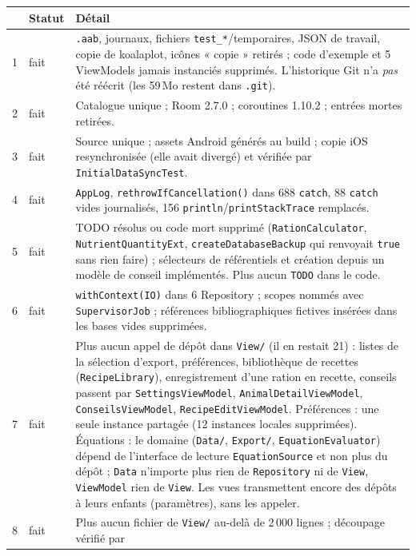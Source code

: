 \documentclass[11pt,a4paper]{article}
\newcommand{\code}[1]{\texttt{#1}}
\begin{document}
\begin{longtable}{p{0.5cm}p{3.2cm}p{11cm}}
\toprule
 & Statut & Détail \\
\midrule
1 & fait & \code{.aab}, journaux, fichiers \code{test\_*}/temporaires, JSON de travail, copie de
           koalaplot, icônes « copie » retirés ; code d'exemple et 5 ViewModels jamais instanciés
           supprimés. L'historique Git n'a \emph{pas} été réécrit (les 59\,Mo restent dans
           \code{.git}). \\
2 & fait & Catalogue unique ; Room 2.7.0 ; coroutines 1.10.2 ; entrées mortes retirées. \\
3 & fait & Source unique ; assets Android générés au build ; copie iOS resynchronisée (elle
           avait divergé) et vérifiée par \code{InitialDataSyncTest}. \\
4 & fait & \code{AppLog}, \code{rethrowIfCancellation()} dans 688 \code{catch}, 88 \code{catch}
           vides journalisés, 156 \code{println}/\code{printStackTrace} remplacés. \\
5 & fait & TODO résolus ou code mort supprimé (\code{RationCalculator},
           \code{NutrientQuantityExt}, \code{createDatabaseBackup} qui renvoyait \code{true}
           sans rien faire) ; sélecteurs de référentiels et création depuis un modèle de conseil
           implémentés. Plus aucun \code{TODO} dans le code. \\
6 & fait & \code{withContext(IO)} dans 6 Repository ; scopes nommés avec \code{SupervisorJob} ;
           références bibliographiques fictives insérées dans les bases vides supprimées. \\
7 & fait & Plus aucun appel de dépôt dans \code{View/} (il en restait 21) : listes de la sélection
           d'export, préférences, bibliothèque de recettes (\code{RecipeLibrary}), enregistrement d'une
           ration en recette, conseils passent par \code{SettingsViewModel},
           \code{AnimalDetailViewModel}, \code{ConseilsViewModel}, \code{RecipeEditViewModel}.
           Préférences : une seule instance partagée (12 instances locales supprimées).
           Équations : le domaine (\code{Data/}, \code{Export/}, \code{EquationEvaluator}) dépend de
           l'interface de lecture \code{EquationSource} et non plus du dépôt ; \code{Data} n'importe
           plus rien de \code{Repository} ni de \code{View}, \code{ViewModel} rien de \code{View}.
           Les vues transmettent encore des dépôts à leurs enfants (paramètres), sans les appeler. \\
8 & fait & Plus aucun fichier de \code{View/} au-delà de 2\,000 lignes ; découpage vérifié par

\end{longtable}
\end{document}
